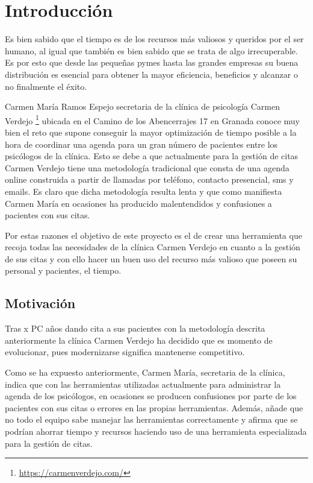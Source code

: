 \chapter{Introducción} \label{intro}
Es bien sabido que el tiempo es de los recursos más valiosos y queridos por el ser humano, al igual que también es bien sabido que se trata de algo irrecuperable. Es por esto que desde las pequeñas pymes hasta las grandes empresas su buena distribución es esencial para obtener la mayor eficiencia, beneficios y alcanzar o no finalmente el éxito.\bigskip


Carmen María Ramos Espejo secretaria de la clínica de psicología Carmen Verdejo \footnote{\url{https://carmenverdejo.com/}} ubicada en el Camino de los Abencerrajes 17 en Granada conoce muy bien el reto que supone conseguir la mayor optimización de tiempo posible a la hora de coordinar una agenda para un gran número de pacientes entre los psicólogos de la clínica. Esto se debe a que actualmente para la gestión de citas Carmen Verdejo tiene una metodología tradicional que consta de una agenda online construida a partir de llamadas por teléfono, contacto presencial, sms y emails. Es claro que dicha metodología resulta lenta y que como manifiesta Carmen María en ocasiones ha producido malentendidos y confusiones a pacientes con sus citas.\bigskip


Por estas razones el objetivo de este proyecto es el de crear una herramienta que recoja todas las necesidades de la clínica Carmen Verdejo en cuanto a la gestión de sus citas y con ello hacer un buen uso del recurso más valioso que poseen su personal y pacientes, el tiempo.

\section{Motivación}
Tras x PC años dando cita a sus pacientes con la metodología descrita anteriormente la clínica Carmen Verdejo ha decidido que es momento de evolucionar, pues modernizarse significa mantenerse competitivo. \bigskip

Como se ha expuesto anteriormente, Carmen María, secretaria de la clínica, indica que con las herramientas utilizadas actualmente para administrar la agenda de los psicólogos, en ocasiones se producen confusiones por parte de los pacientes con sus citas o errores en las propias herramientas. Además, añade que no todo el equipo sabe manejar las herramientas correctamente y afirma que se podrían ahorrar tiempo y recursos haciendo uso de una herramienta especializada para la gestión de citas. \bigskip

